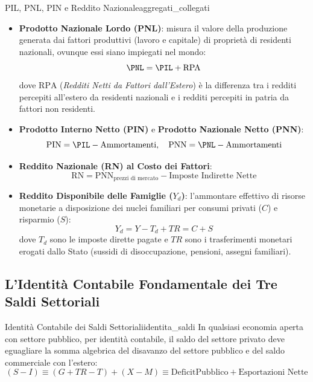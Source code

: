 \begin{definizione}{PIL, PNL, PIN e Reddito Nazionale}{aggregati_collegati}
\begin{itemize}
    \item \textbf{Prodotto Nazionale Lordo (PNL)}: misura il valore della produzione generata dai fattori produttivi (lavoro e capitale) di proprietà di residenti nazionali, ovunque essi siano impiegati nel mondo:
    \begin{equation}
        \PNL = \PIL + \text{RPA}
    \end{equation}
    dove $\text{RPA}$ (\textit{Redditi Netti da Fattori dall'Estero}) è la differenza tra i redditi percepiti all'estero da residenti nazionali e i redditi percepiti in patria da fattori non residenti.
    
    \item \textbf{Prodotto Interno Netto (PIN)} e \textbf{Prodotto Nazionale Netto (PNN)}:
    \begin{equation}
        \mathrm{PIN} = \PIL - \text{Ammortamenti}, \quad \mathrm{PNN} = \PNL - \text{Ammortamenti}
    \end{equation}
    
    \item \textbf{Reddito Nazionale (RN) al Costo dei Fattori}:
    \begin{equation}
        \mathrm{RN} = \mathrm{PNN}_{\text{prezzi di mercato}} - \text{Imposte Indirette Nette}
    \end{equation}
    
    \item \textbf{Reddito Disponibile delle Famiglie ($Y_d$)}: l'ammontare effettivo di risorse monetarie a disposizione dei nuclei familiari per consumi privati ($C$) e risparmio ($S$):
    \begin{equation}
        Y_d = Y - T_d + TR = C + S
    \end{equation}
    dove $T_d$ sono le imposte dirette pagate e $TR$ sono i trasferimenti monetari erogati dallo Stato (sussidi di disoccupazione, pensioni, assegni familiari).
\end{itemize}
\end{definizione}

\subsection{L'Identità Contabile Fondamentale dei Tre Saldi Settoriali}

\begin{teorema}{Identità Contabile dei Saldi Settoriali}{identita_saldi}
In qualsiasi economia aperta con settore pubblico, per identità contabile, il saldo del settore privato deve eguagliare la somma algebrica del disavanzo del settore pubblico e del saldo commerciale con l'estero:
\begin{equation}
    (S - I) \equiv (G + TR - T) + (X - M) \equiv \mathrm{Deficit Pubblico} + \text{Esportazioni Nette}
\end{equation}
\end{teorema}

